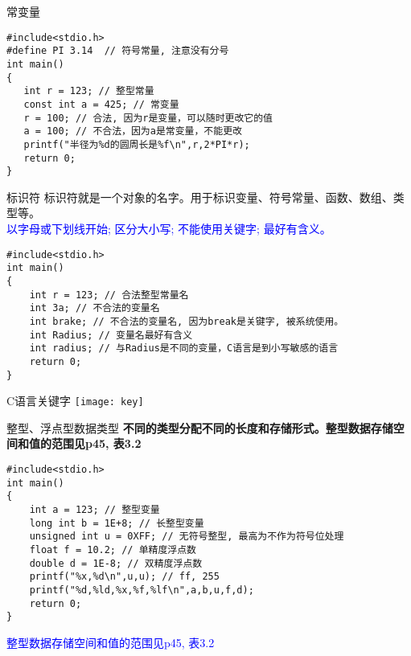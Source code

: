 \begin{frame}[fragile]{常变量}
\begin{lstlisting}
#include<stdio.h> 
#define PI 3.14  // 符号常量, 注意没有分号           
int main()                   
{                            
   int r = 123; // 整型常量
   const int a = 425; // 常变量
   r = 100; // 合法, 因为r是变量，可以随时更改它的值
   a = 100; // 不合法，因为a是常变量，不能更改
   printf("半径为%d的圆周长是%f\n",r,2*PI*r); 
   return 0;           
}                            
\end{lstlisting}
\end{frame}

\begin{frame}[fragile]{标识符}
标识符就是一个对象的名字。用于标识变量、符号常量、函数、数组、类型等。\\
\textcolor{blue}{以字母或下划线开始; 区分大小写; 不能使用关键字; 最好有含义。}
\begin{lstlisting}
#include<stdio.h>           
int main()                   
{                            
    int r = 123; // 合法整型常量名
    int 3a; // 不合法的变量名
    int brake; // 不合法的变量名, 因为break是关键字, 被系统使用。
    int Radius; // 变量名最好有含义
    int radius; // 与Radius是不同的变量，C语言是到小写敏感的语言
    return 0;           
}                            
\end{lstlisting}
\end{frame}

\begin{frame}{C语言关键字}
\texttt{[image: key]}
\end{frame}

\begin{frame}[fragile]{整型、浮点型数据类型}
\textbf{不同的类型分配不同的长度和存储形式。整型数据存储空间和值的范围见p45, 表3.2}
\begin{lstlisting}
#include<stdio.h>           
int main()                   
{                            
    int a = 123; // 整型变量
    long int b = 1E+8; // 长整型变量
    unsigned int u = 0XFF; // 无符号整型, 最高为不作为符号位处理
    float f = 10.2; // 单精度浮点数
    double d = 1E-8; // 双精度浮点数
    printf("%x,%d\n",u,u); // ff, 255
    printf("%d,%ld,%x,%f,%lf\n",a,b,u,f,d);
    return 0;           
}                            
\end{lstlisting}
\textcolor{blue}{整型数据存储空间和值的范围见p45, 表3.2}
\end{frame}

